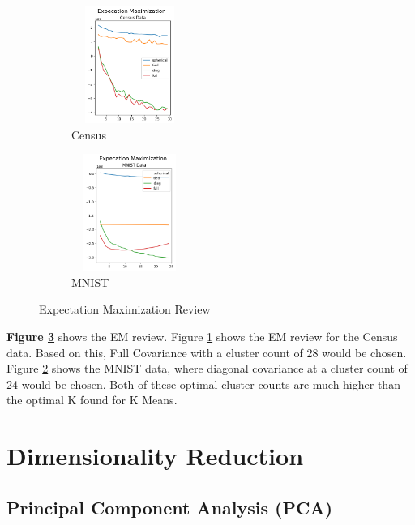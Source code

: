 \documentclass[letterpaper]{article} %
\begin{document}
\begin{figure}[!htb]
	\centering
		\begin{subfigure} [b]{.25\textwidth}
			\centering
			\includegraphics[width=1.5in, height=1.5in]{figures/Expecation_Maximization_Census_Data.png}
			\caption{Census}
			\label{fig:em_census}
		\end{subfigure}%
		\begin{subfigure}[b]  {.25\textwidth}
			\includegraphics[width=1.5in, height=1.5in]{figures/Expecation_Maximization_MNIST_Data.png}
			\caption{MNIST}
			\label{fig:em_mnist}
		\end{subfigure}
		\caption{Expectation Maximization Review}
		\label{fig:expectation_maximization}
\end{figure}

\textbf{Figure \ref{fig:expectation_maximization}} shows the EM review. Figure \ref{fig:em_census}  shows the EM review for the Census data.  Based on this, Full Covariance with a cluster count of 28 would be chosen.  Figure \ref{fig:em_mnist} shows the MNIST data, where diagonal covariance at a cluster count of 24 would be chosen.   Both of these optimal cluster counts are much higher than the optimal K found for K Means.

\section{Dimensionality Reduction}

\subsection{Principal Component Analysis (PCA)}
\end{document}
